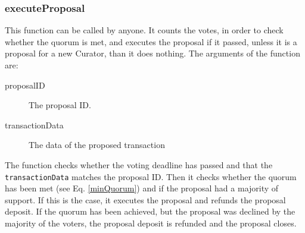 \documentclass[9pt,oneside]{amsart}
\begin{document}
\begin{multicols}{2}
\subsubsection*{executeProposal}
This function can be called by anyone. It counts the votes, in order to check whether the quorum is met, and executes the proposal if it passed, unless it is a proposal for a new Curator, than it does nothing.
The arguments of the function are:
\begin{description}
 \item[proposalID] The proposal ID.
 \item[transactionData] The data of the proposed transaction
\end{description}
The function checks whether the voting deadline has passed and that the \verb|transactionData| matches the proposal ID. Then it checks whether the quorum has been met (see Eq. \ref{minQuorum}) and if the proposal had a majority of support. If this is the case, it executes the proposal and refunds the 
proposal deposit. If the quorum has been achieved, but the proposal was declined by the majority of the voters, the proposal deposit is refunded and the proposal closes.


\end{multicols}
\end{document}
